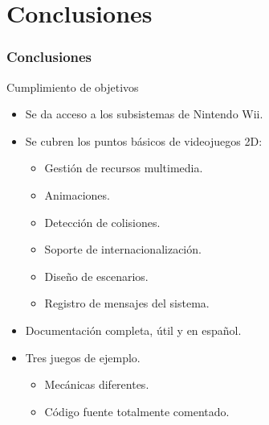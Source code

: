 

\section{Conclusiones}

\begin{frame}	
\frametitle{Conclusiones}
	\begin{block}{Cumplimiento de objetivos}
		\begin{itemize}
			\item Se da acceso a los subsistemas de Nintendo Wii.
			\item Se cubren los puntos básicos de videojuegos 2D:
			\begin{itemize}
				\item Gestión de recursos multimedia.
				\item Animaciones.
				\item Detección de colisiones.
				\item Soporte de internacionalización.
				\item Diseño de escenarios.
				\item Registro de mensajes del sistema.
			\end{itemize}
			\item Documentación completa, útil y en español.
			\item Tres juegos de ejemplo.
			\begin{itemize}
				\item Mecánicas diferentes.
				\item Código fuente totalmente comentado.
			\end{itemize}
		\end{itemize}
	\end{block}
\end{frame}

